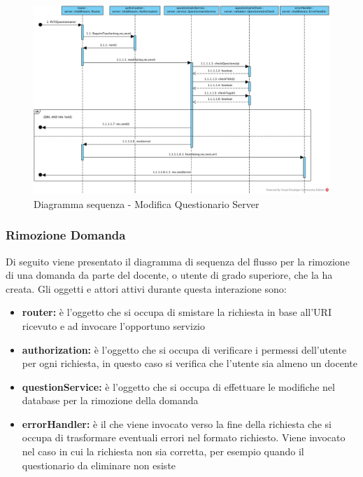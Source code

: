 \documentclass[12pt,a4paper]{article}
\begin{document}
\begin{center}
	\begin{figure}[H]
		\centering \includegraphics[max width=\myheight, angle=90]{../img/diagrammiSequenza/modificaQuestionarioServer.png}
		\caption{Diagramma sequenza - Modifica Questionario Server}
	\end{figure}
\end{center}

\newpage
\subsubsection{Rimozione Domanda}
Di seguito viene presentato il diagramma di sequenza del flusso per la rimozione di una domanda da parte del docente, o utente di grado superiore, che la ha creata. Gli oggetti e attori attivi durante questa interazione sono:

\begin{itemize}
	\item \textbf{router:} è l'oggetto che si occupa di smistare la richiesta in base all’URI ricevuto e ad invocare l’opportuno servizio
	\item \textbf{authorization:} è l'oggetto che si occupa di verificare i permessi dell'utente per ogni richiesta, in questo caso si verifica che l'utente sia almeno un docente
	\item \textbf{questionService:} è l'oggetto che si occupa di effettuare le modifiche nel database per la rimozione della domanda
	\item \textbf{errorHandler:} è il  che viene invocato verso la fine della richiesta che si occupa di trasformare eventuali errori nel formato  richiesto. Viene invocato nel caso in cui la richiesta non sia corretta, per esempio quando il questionario da eliminare non esiste
\end{itemize}
\end{document}

